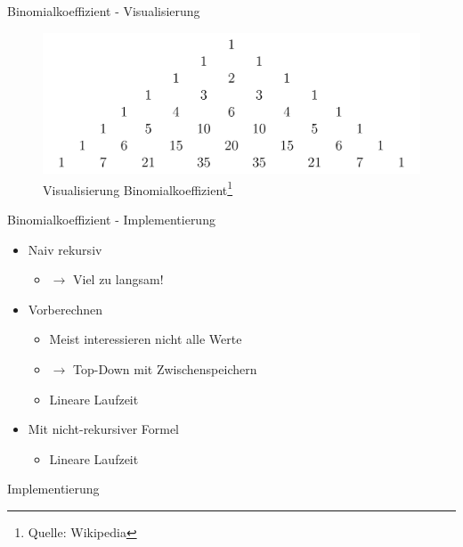 \documentclass[18pt]{beamer}
\begin{document}
\begin{frame}{Binomialkoeffizient - Visualisierung}
\begin{figure}
  \caption{Visualisierung Binomialkoeffizient\footnote{Quelle: Wikipedia}}
  \centering
	\includegraphics[scale=0.15]{binom.png}
\end{figure}
\end{frame}

\begin{frame}{Binomialkoeffizient - Implementierung}
\begin{itemize}
\item Naiv rekursiv
\begin{itemize}
\item $\rightarrow$ Viel zu langsam!
\end{itemize}
\item Vorberechnen
\begin{itemize}
\item Meist interessieren nicht alle Werte
\item $\rightarrow$ Top-Down mit Zwischenspeichern
\item Lineare Laufzeit
\end{itemize}
\item Mit nicht-rekursiver Formel
\begin{itemize}
\item Lineare Laufzeit
\end{itemize}
\end{itemize}
\end{frame}


\begin{frame} {Implementierung}
\end{frame}
\end{document}

